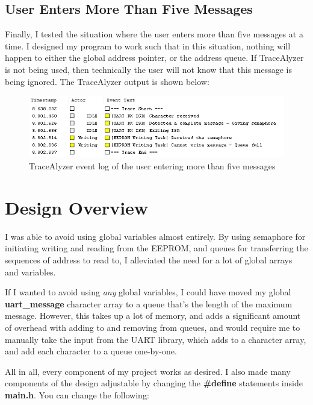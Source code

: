 \documentclass[a4paper, 12pt]{article}
\begin{document}
\subsection{User Enters More Than Five Messages}
Finally, I tested the situation where the user enters more than five messages at a time. I designed my program to work such that in this situation, nothing will happen to either the global address pointer, or the address queue. If TraceAlyzer is not being used, then technically the user will not know that this message is being ignored. The TraceAlyzer output is shown below:

\begin{figure}[H]
\centering
\includegraphics[width=\textwidth]{too-many-messages.PNG}
\caption{TraceAlyzer event log of the user entering more than five messages}
\label{fig:too-many-messages}
\end{figure}

\section{Design Overview}
I was able to avoid using global variables almost entirely. By using semaphore for initiating writing and reading from the EEPROM, and queues for transferring the sequences of address to read to, I alleviated the need for a lot of global arrays and variables.

If I wanted to avoid using \emph{any} global variables, I could have moved my global \textbf{uart\_message} character array to a queue that's the length of the maximum message. However, this takes up a lot of memory, and adds a significant amount of overhead with adding to and removing from queues, and would require me to manually take the input from the UART library, which adds to a character array, and add each character to a queue one-by-one. 

All in all, every component of my project works as desired. I also made many components of the design adjustable by changing the \textbf{\#define} statements inside \textbf{main.h}. You can change the following:
\end{document}
